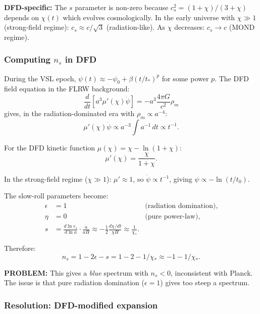 \documentclass[11pt,a4paper]{article}
\begin{document}
\textbf{DFD-specific:} The $s$ parameter is non-zero because $c_s^2 = (1+\chi)/(3+\chi)$ depends on $\chi(t)$ which evolves cosmologically. In the early universe with $\chi \gg 1$ (strong-field regime): $c_s \approx c/\sqrt{3}$ (radiation-like). As $\chi$ decreases: $c_s \to c$ (MOND regime).

\subsubsection{Computing $n_s$ in DFD}

During the VSL epoch, $\psi(t) \approx -\psi_0 + \beta(t/t_*)^p$ for some power $p$. The DFD field equation in the FLRW background:
\begin{equation}
\frac{d}{dt}\left[a^3\mu'(\chi)\dot\psi\right] = -a^3\frac{4\pi G}{c^2}\rho_m
\end{equation}
gives, in the radiation-dominated era with $\rho_m \propto a^{-4}$:
\begin{equation}
\mu'(\chi)\dot\psi \propto a^{-3}\int a^{-1}\,dt \propto t^{-1}.
\end{equation}

For the DFD kinetic function $\mu(\chi) = \chi - \ln(1+\chi)$:
\begin{equation}
\mu'(\chi) = \frac{\chi}{1+\chi}.
\end{equation}

In the strong-field regime ($\chi \gg 1$): $\mu' \approx 1$, so $\dot\psi \propto t^{-1}$, giving $\psi \propto -\ln(t/t_0)$.

The slow-roll parameters become:
\begin{align}
\epsilon &= 1 & \text{(radiation domination)}, \\
\eta &= 0 & \text{(pure power-law)}, \\
s &= \frac{d\ln c_s}{d\ln a}\cdot\frac{\dot a}{aH} \approx -\frac{1}{2}\frac{d\chi/dt}{\chi H} \approx \frac{1}{\chi_*}.
\end{align}

Therefore:
\begin{equation}\label{eq:ns-DFD}
\boxed{n_s = 1 - 2\epsilon - s = 1 - 2 - 1/\chi_* \approx -1 - 1/\chi_*.}
\end{equation}

\textbf{PROBLEM:} This gives a \emph{blue} spectrum with $n_s < 0$, inconsistent with Planck. The issue is that pure radiation domination ($\epsilon = 1$) gives too steep a spectrum.

\subsubsection{Resolution: DFD-modified expansion}
\end{document}
